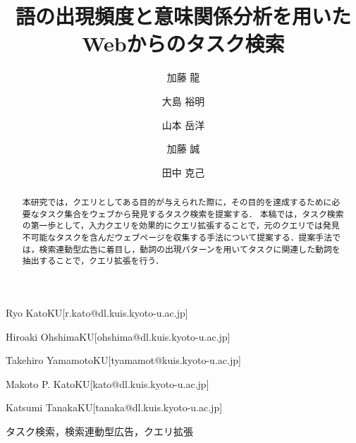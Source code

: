 \documentclass[submit,techreq]{ipsj}
\begin{document}
\title{語の出現頻度と意味関係分析を用いた\\
Webからのタスク検索}







\author{加藤 龍}{Ryo Kato}{KU}[r.kato@dl.kuis.kyoto-u.ac.jp]
\author{大島 裕明}{Hiroaki Ohshima}{KU}[ohshima@dl.kuis.kyoto-u.ac.jp]
\author{山本 岳洋}{Takehiro Yamamoto}{KU}[tyamamot@kuis.kyoto-u.ac.jp]
\author{加藤 誠}{Makoto P. Kato}{KU}[kato@dl.kuis.kyoto-u.ac.jp]
\author{田中 克己}{Katsumi Tanaka}{KU}[tanaka@dl.kuis.kyoto-u.ac.jp]

\begin{abstract}
本研究では，クエリとしてある目的が与えられた際に，その目的を達成するために必要なタスク集合をウェブから発見するタスク検索を提案する． 
本稿では，タスク検索の第一歩として，入力クエリを効果的にクエリ拡張することで，元のクエリでは発見不可能なタスクを含んだウェブページを収集する手法について提案する．提案手法では，検索連動型広告に着目し，動詞の出現パターンを用いてタスクに関連した動詞を抽出することで，クエリ拡張を行う． 
\end{abstract}

\begin{jkeyword}
タスク検索，検索連動型広告，クエリ拡張
\end{jkeyword}

%

\maketitle
\end{document}
